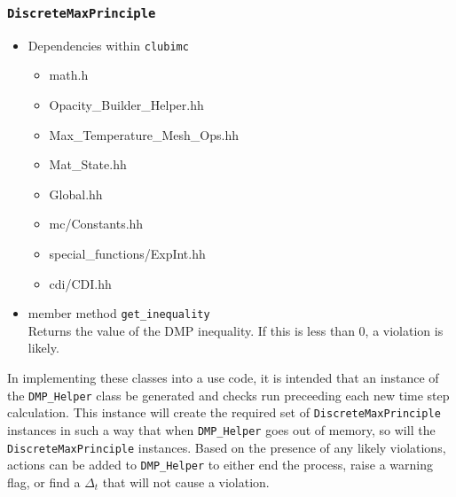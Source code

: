 \subsubsection{\texttt{DiscreteMaxPrinciple}}
\begin{itemize}
 \item Dependencies within \texttt{clubimc}
    \begin{itemize}
	\item math.h
	\item Opacity\_Builder\_Helper.hh
	\item Max\_Temperature\_Mesh\_Ops.hh
	\item Mat\_State.hh
	\item Global.hh
	\item mc/Constants.hh
	\item special\_functions/ExpInt.hh
	\item cdi/CDI.hh
    \end{itemize}
 \item member method \texttt{get\_inequality} \\
Returns the value of the DMP inequality.  If this is less than 0, a violation
is likely.
\end{itemize}

In implementing these classes into a use code, it is intended that an instance
of the \texttt{DMP\_Helper} class be generated and checks run
preceeding each new time step calculation. This instance will create the
required set of \texttt{DiscreteMaxPrinciple} instances in such a way that when
\texttt{DMP\_Helper} goes out of memory, so will the
\texttt{DiscreteMaxPrinciple} instances.  Based on the presence of any likely
violations, actions can be added to \texttt{DMP\_Helper} to either end the
process, raise a warning flag, or find a $\Delta_t$ that will not cause a
violation.
